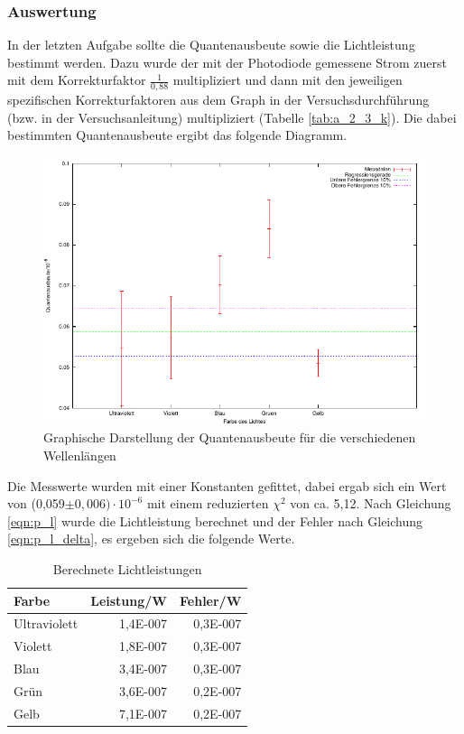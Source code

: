 \documentclass[12px]{scrartcl}
\begin{document}
\subsubsection{Auswertung}
In der letzten Aufgabe sollte die Quantenausbeute sowie die Lichtleistung bestimmt werden. Dazu wurde der mit der Photodiode gemessene Strom zuerst mit dem Korrekturfaktor $\frac{1}{0,88}$ multipliziert und dann mit den jeweiligen spezifischen Korrekturfaktoren aus dem Graph in der Versuchsdurchführung (bzw. in der Versuchsanleitung) multipliziert (Tabelle \ref{tab:a_2_3_k}). Die dabei bestimmten Quantenausbeute ergibt das folgende Diagramm.

\begin{figure}[H]
\centering
    \includegraphics[scale = 1]{a_2_2.pdf}
  	\caption[Graphische Darstellung der Quantenausbeute für die verschiedenen Wellenlängen]{Graphische Darstellung der Quantenausbeute für die verschiedenen Wellenlängen}
  \label{fig:a_2_3}
\end{figure}

Die Messwerte wurden mit einer Konstanten gefittet, dabei ergab sich ein Wert von (0,059$\pm 0,006)\cdot10^{-6}$ mit einem reduzierten $\chi^2$ von ca. 5,12. Nach Gleichung \ref{eqn:p_l} wurde die Lichtleistung berechnet und der Fehler nach Gleichung \ref{eqn:p_l_delta}, es ergeben sich die folgende Werte.

\begin{table}[H]
\caption{Berechnete Lichtleistungen}
\begin{center}
\begin{tabular}{|l|r|r|}
\hline
Farbe & \multicolumn{1}{l|}{Leistung/W} & \multicolumn{1}{l|}{Fehler/W} \\ \hline
Ultraviolett & 1,4E-007 & 0,3E-007 \\ \hline
Violett & 1,8E-007 & 0,3E-007 \\ \hline
Blau & 3,4E-007 & 0,3E-007 \\ \hline
Grün & 3,6E-007 & 0,2E-007 \\ \hline
Gelb & 7,1E-007 & 0,2E-007 \\ \hline
\end{tabular}
\end{center}
\label{tab:a_2_3_l}
\end{table}
\end{document}
